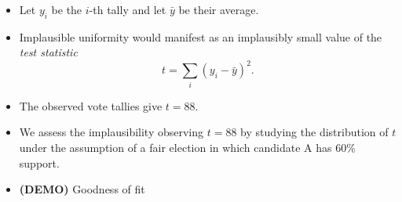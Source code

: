 \documentclass{beamer}
\begin{document}
    \begin{frame}
        \begin{itemize}
            \item Let $y_i$ be the $i$-th tally and let $\bar{y}$ be their average.
            \item Implausible uniformity would manifest as an implausibly small value of the \emph{test statistic}
            \[
            t = \sum_i (y_i - \bar{y})^2.
            \]
            \item The observed vote tallies give $t=88$.
            \item We assess the implausibility observing $t=88$ by studying the distribution of $t$ under the assumption of a fair election in which candidate A has 60\% support.
            \item \textbf{(DEMO)} Goodness of fit
        \end{itemize} 
    \end{frame}
\end{document}
